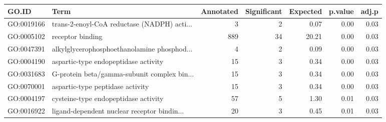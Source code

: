 \begin{table}[ht]
\centering
\begin{tabular}{llrrrrr}
  \hline
GO.ID & Term & Annotated & Significant & Expected & p.value & adj.p \\ 
  \hline
GO:0019166 & trans-2-enoyl-CoA reductase (NADPH) acti... &   3 &   2 & 0.07 & 0.00 & 0.03 \\ 
  GO:0005102 & receptor binding & 889 &  34 & 20.21 & 0.00 & 0.03 \\ 
  GO:0047391 & alkylglycerophosphoethanolamine phosphod... &   4 &   2 & 0.09 & 0.00 & 0.03 \\ 
  GO:0004190 & aspartic-type endopeptidase activity &  15 &   3 & 0.34 & 0.00 & 0.03 \\ 
  GO:0031683 & G-protein beta/gamma-subunit complex bin... &  15 &   3 & 0.34 & 0.00 & 0.03 \\ 
  GO:0070001 & aspartic-type peptidase activity &  15 &   3 & 0.34 & 0.00 & 0.03 \\ 
  GO:0004197 & cysteine-type endopeptidase activity &  57 &   5 & 1.30 & 0.01 & 0.03 \\ 
  GO:0016922 & ligand-dependent nuclear receptor bindin... &  20 &   3 & 0.45 & 0.01 & 0.03 \\ 
   \hline
\end{tabular}
\end{table}
